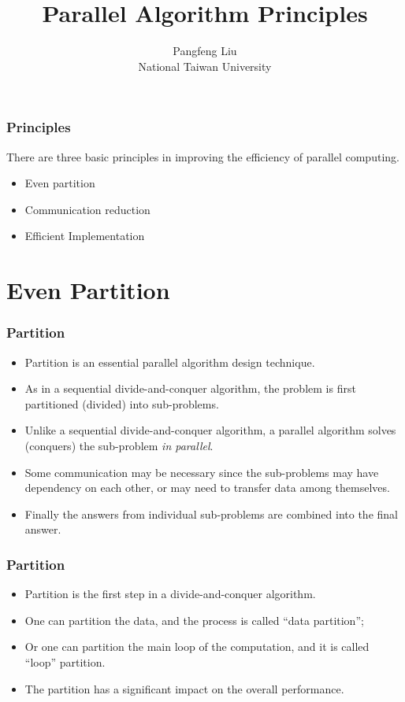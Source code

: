 \documentclass{beamer}
\begin{document}
\begin{CJK}{UTF8}{bsmi}

\title{Parallel Algorithm Principles}

\author{Pangfeng Liu \\ National Taiwan University}

\begin{frame}
\titlepage
\end{frame}

\begin{frame}
\frametitle{Principles} There are three basic principles in improving
the efficiency of parallel computing.
\begin{itemize}
\item Even partition
\item Communication reduction
\item Efficient Implementation
\end{itemize}
\end{frame}

\section{Even Partition}

\begin{frame}
\frametitle{Partition}
\begin{itemize}
\item Partition is an essential parallel algorithm design technique.
\item As in a sequential divide-and-conquer algorithm, the problem is
  first partitioned (divided) into sub-problems.
\item Unlike a sequential divide-and-conquer algorithm, a parallel
  algorithm solves (conquers) the sub-problem {\em in parallel}.
\item Some communication may be necessary since the sub-problems may
  have dependency on each other, or may need to transfer data among
  themselves.
\item Finally the answers from individual sub-problems are combined
  into the final answer.
\end{itemize}
\end{frame}

\begin{frame}
\frametitle{Partition}
\begin{itemize}
\item Partition is the first step in a divide-and-conquer algorithm.
\item One can partition the data, and the process is called ``data
  partition'';
\item Or one can partition the main loop of the computation, and it is
  called ``loop'' partition.
\item The partition has a significant impact on the overall
  performance.
\end{itemize}
\end{frame}


\end{CJK}
\end{document}
